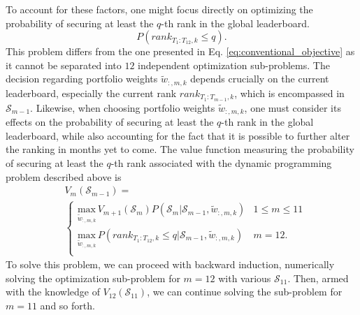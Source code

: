 \documentclass[3p,times,twocolumn]{elsarticle}
\begin{document}
To account for these factors, one might focus directly on optimizing the probability of securing at least the $q$-th rank in the global leaderboard.
\begin{equation}
    P\left(rank_{T_1:T_{12},k}\leq q\right).
\end{equation}
This problem differs from the one presented in Eq. \ref{eq:conventional_objective} as it cannot be separated into $12$ independent optimization sub-problems.
The decision regarding portfolio weights $\tilde{w}_{:,m,k}$ depends crucially on the current leaderboard, especially the current rank $rank_{T_1:T_{m-1},k}$, which is encompassed in $\mathcal{S}_{m-1}$.
Likewise, when choosing portfolio weights $\tilde{w}_{:,m,k}$, one must consider its effects on the probability of securing at least the $q$-th rank in the global leaderboard, while also accounting for the fact that it is possible to further alter the ranking in months yet to come.
The value function measuring the probability of securing at least the $q$-th rank associated with the dynamic programming problem described above is
\begin{equation}
    \begin{split}
        &V_{m}(\mathcal{\mathcal{S}}_{m-1})=\\
        &\begin{cases}
            \underset{ \tilde{w}_{:,m,k}}{\textrm{max}} \, V_{m+1}(\mathcal{\mathcal{S}}_{m})P\left( \mathcal{\mathcal{S}}_{m}| \mathcal{\mathcal{S}}_{m-1}, \tilde{w}_{:,m,k}\right) & 1\leq m \leq 11 \\
            \underset{ \tilde{w}_{:,m,k}}{\textrm{max}} \, P\left(rank_{T_1:T_{12},k}\leq q| \mathcal{\mathcal{S}}_{m-1}, \tilde{w}_{:,m,k}\right)                                    & m=12.           \\
        \end{cases}
    \end{split}
\end{equation}
To solve this problem, we can proceed with backward induction, numerically solving the optimization sub-problem for $m=12$ with various $\mathcal{S}_{11}$. Then, armed with the knowledge of $V_{12}(\mathcal{S}_{11})$, we can continue solving the sub-problem for $m=11$ and so forth.
\end{document}
